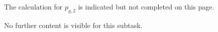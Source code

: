 The calculation for \( p_{g,2} \) is indicated but not completed on this page.  

No further content is visible for this subtask.